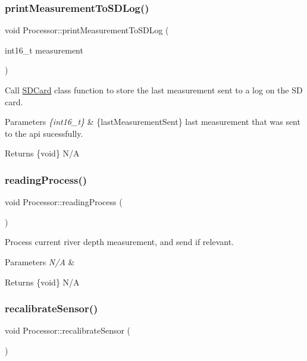 \subsubsection{\texorpdfstring{print\+Measurement\+To\+S\+D\+Log()}{printMeasurementToSDLog()}}
{\footnotesize\ttfamily void Processor\+::print\+Measurement\+To\+S\+D\+Log (\begin{DoxyParamCaption}\item[{int16\+\_\+t}]{measurement }\end{DoxyParamCaption})}

Call \mbox{\hyperlink{class_s_d_card}{S\+D\+Card}} class function to store the last measurement sent to a log on the SD card. 
\begin{DoxyParams}{Parameters}
{\em \{int16\+\_\+t\}} & \{last\+Measurement\+Sent\} last measurement that was sent to the api sucessfully. \\
\hline
\end{DoxyParams}
\begin{DoxyReturn}{Returns}
\{void\} N/A 
\end{DoxyReturn}
\mbox{\label{class_processor_a694b889c3c6f8c09b998b4012d304d6e}} 
\subsubsection{\texorpdfstring{reading\+Process()}{readingProcess()}}
{\footnotesize\ttfamily void Processor\+::reading\+Process (\begin{DoxyParamCaption}{ }\end{DoxyParamCaption})}

Process current river depth measurement, and send if relevant. 
\begin{DoxyParams}{Parameters}
{\em N/A} & \\
\hline
\end{DoxyParams}
\begin{DoxyReturn}{Returns}
\{void\} N/A 
\end{DoxyReturn}
\mbox{\label{class_processor_ae18acf2c55d0a3bcd7412f86d388808d}} 
\subsubsection{\texorpdfstring{recalibrate\+Sensor()}{recalibrateSensor()}}
{\footnotesize\ttfamily void Processor\+::recalibrate\+Sensor (\begin{DoxyParamCaption}{ }\end{DoxyParamCaption})}

